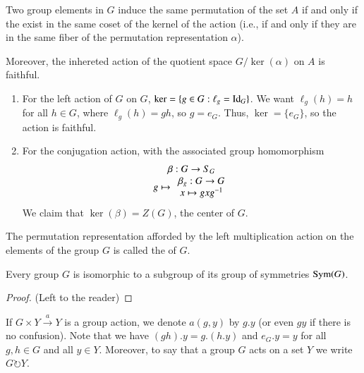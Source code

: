 \documentclass[12pt, a4paper, oneside, openright, titlepage]{book}
\begin{document}
\begin{rmk}
    Two group elements in $G$ induce the same permutation of the set $A$ if and only if the exist in the same coset of the kernel of the action (i.e., if and only if they are in the same fiber of the permutation representation $\alpha$).


    Moreover, the inhereted action of the quotient space $G/\ker(\alpha)$ on $A$ is faithful.
\end{rmk}


\begin{eg}
        \leavevmode
        \begin{enumerate}
                \item For the left action of $G$ on $G$, $\ker = \{g \in G: \ell_g = \operatorname{Id}_G\}$. We want $\ell_g(h) = h$ for all $h \in G$, where $\ell_g(h) = gh$, so $g = e_G$. Thus, $\ker = \{e_G\}$, so the action is faithful.
                \item For the conjugation action, with the associated group homomorphism \begin{equation}
                                \begin{array}{c} \beta:G\rightarrow S_G \\ g\mapsto\begin{array}{c} \beta_g:G\rightarrow G \\ x\mapsto gxg^{-1} \end{array} \end{array}
                        \end{equation}
                        We claim that $\ker(\beta) = Z(G)$, the center of $G$.
        \end{enumerate}
\end{eg}


\begin{defn}
    The permutation representation afforded by the left multiplication action on the elements of the group $G$ is called the  of $G$.
\end{defn}

\begin{namthm}
        Every group $G$ is isomorphic to a subgroup of its group of symmetries $\operatorname{Sym}(G)$.
\end{namthm}
\begin{proof}
        (Left to the reader)
\end{proof}


\begin{nota} 
        If $G\times Y\xrightarrow{a}Y$ is a group action, we denote $a(g,y)$ by $g.y$ (or even $gy$ if there is no confusion). Note that we have $(gh).y = g.(h.y)$ and $e_G.y = y$ for all $g,h \in G$ and all $y \in Y$. Moreover, to say that a group $G$ acts on a set $Y$ we write $G \circlearrowright Y$.
\end{nota}
\end{document}
